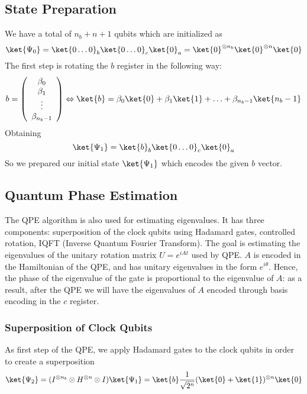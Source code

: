 \documentclass[10pt]{article}
\begin{document}
\subsection{State Preparation}
We have a total of $n_b + n + 1$ qubits which are initialized as
$$\ket{\Psi_0}=\ket{0\ldots0}_b\ket{0\ldots0}_c\ket{0}_a = \ket{0}^{\otimes n_b}\ket{0}^{\otimes n}\ket{0}$$
The first step is rotating the $b$ register in the following way:
$$b=\left(\begin{array}{c}\beta_0\\\beta_1\\\vdots\\\beta_{n_b-1}\end{array}\right)\Leftrightarrow\ket{b}=\beta_0\ket{0}+\beta_1\ket{1}+\ldots+\beta_{n_b-1}\ket{n_b-1}$$
Obtaining
$$\ket{\Psi_1}=\ket{b}_b\ket{0\ldots0}_c\ket{0}_a$$
So we prepared our initial state $\ket{\Psi_1}$ which encodes the given $b$ vector.
\subsection{Quantum Phase Estimation}
The QPE algorithm is also used for estimating eigenvalues. It has three components: superposition of the clock qubits using Hadamard gates, controlled rotation, IQFT (Inverse Quantum Fourier Transform). The goal is estimating the eigenvalues of the unitary rotation matrix $U = e^{iAt}$ used by QPE. $A$ is encoded in the Hamiltonian of the QPE, and has unitary eigenvalues in the form $e^{i\theta}$. Hence, the phase of the eigenvalue of the gate is proportional to the eigenvalue of $A$: as a result, after the QPE we will have the eigenvalues of $A$ encoded through basis encoding in the $c$ register.
\subsubsection{Superposition of Clock Qubits}
As first step of the QPE, we apply Hadamard gates to the clock qubits in order to create a superposition
$$\ket{\Psi_2} = (I^{\otimes n_b}\otimes H^{\otimes n}\otimes I)\ket{\Psi_1}= \ket{b}\frac{1}{\sqrt{2^n}}(\ket{0}+\ket{1})^{\otimes n}\ket{0}$$
\end{document}
